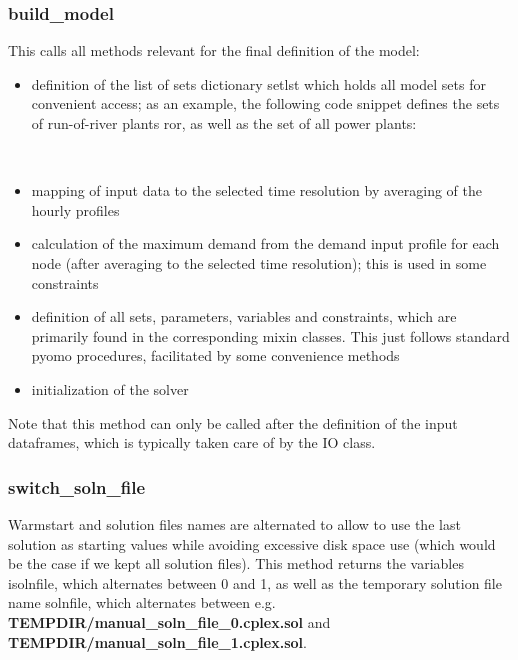 \documentclass[]{article}
\begin{document}
\subsubsection{build\_model}\label{buildux5fmodel}

This calls all methods relevant for the final definition of the model:

\begin{itemize}
\item
  definition of the list of sets dictionary setlst which holds all model
  sets for convenient access; as an example, the following code snippet
  defines the sets of run-of-river plants ror, as well as the set of all
  power plants:
  \begin{verbatim}
  	
  \end{verbatim}

\item
  mapping of input data to the selected time resolution by averaging of
  the hourly profiles
\item
  calculation of the maximum demand from the demand input profile for
  each node (after averaging to the selected time resolution); this is
  used in some constraints
\item
  definition of all sets, parameters, variables and constraints, which
  are primarily found in the corresponding mixin classes. This just
  follows standard pyomo procedures, facilitated by some convenience
  methods
\item
  initialization of the solver
\end{itemize}

Note that this method can only be called after the definition of the
input dataframes, which is typically taken care of by the IO class.

\subsubsection{switch\_soln\_file}\label{switchux5fsolnux5ffile}

Warmstart and solution files names are alternated to allow to use the
last solution as starting values while avoiding excessive disk space use
(which would be the case if we kept all solution files). This method
returns the variables isolnfile, which alternates between 0 and 1, as
well as the temporary solution file name solnfile, which alternates
between e.g. \textbf{TEMPDIR/manual\_soln\_file\_0.cplex.sol} and
\textbf{TEMPDIR/manual\_soln\_file\_1.cplex.sol}.
\end{document}
